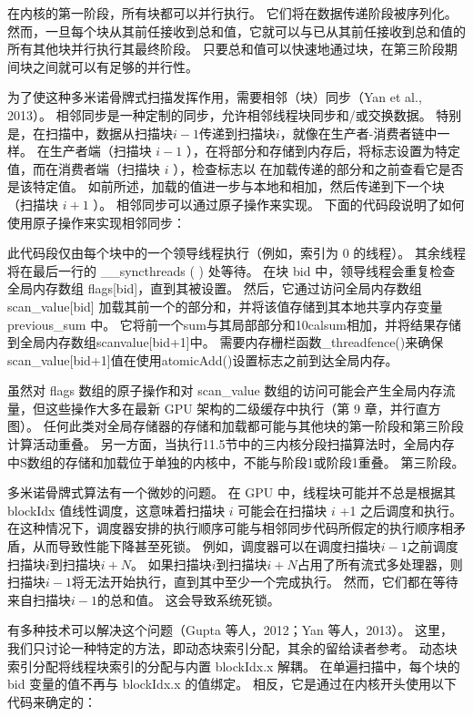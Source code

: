 在内核的第一阶段，所有块都可以并行执行。 它们将在数据传递阶段被序列化。 然而，一旦每个块从其前任接收到总和值，它就可以与已从其前任接收到总和值的所有其他块并行执行其最终阶段。 只要总和值可以快速地通过块，在第三阶段期间块之间就可以有足够的并行性。

为了使这种多米诺骨牌式扫描发挥作用，需要相邻（块）同步（Yan et al., 2013）。 相邻同步是一种定制的同步，允许相邻线程块同步和/或交换数据。 特别是，在扫描中，数据从扫描块$i-1$传递到扫描块$i$，就像在生产者-消费者链中一样。 在生产者端（扫描块 $i-1$ ），在将部分和存储到内存后，将标志设置为特定值，而在消费者端（扫描块 $i$ ），检查标志以 在加载传递的部分和之前查看它是否是该特定值。 如前所述，加载的值进一步与本地和相加，然后传递到下一个块（扫描块 $i+1$ ）。 相邻同步可以通过原子操作来实现。 下面的代码段说明了如何使用原子操作来实现相邻同步：

此代码段仅由每个块中的一个领导线程执行（例如，索引为 0 的线程）。 其余线程将在最后一行的 \_\_syncthreads ( ) 处等待。 在块 bid 中，领导线程会重复检查全局内存数组 flags[bid]，直到其被设置。 然后，它通过访问全局内存数组 scan\_value[bid] 加载其前一个的部分和，并将该值存储到其本地共享内存变量 previous\_sum 中。 它将前一个sum与其局部部分和10calsum相加，并将结果存储到全局内存数组scanvalue[bid+1]中。 需要内存栅栏函数\_threadfence()来确保scan\_value[bid+1]值在使用atomicAdd()设置标志之前到达全局内存。

虽然对 flags 数组的原子操作和对 scan\_value 数组的访问可能会产生全局内存流量，但这些操作大多在最新 GPU 架构的二级缓存中执行（第 9 章，并行直方图）。 任何此类对全局存储器的存储和加载都可能与其他块的第一阶段和第三阶段计算活动重叠。 另一方面，当执行11.5节中的三内核分段扫描算法时，全局内存中$\mathrm{S}$数组的存储和加载位于单独的内核中，不能与阶段1或阶段1重叠。 第三阶段。

多米诺骨牌式算法有一个微妙的问题。 在 GPU 中，线程块可能并不总是根据其 blockIdx 值线性调度，这意味着扫描块 $i$ 可能会在扫描块 $i$ +1 之后调度和执行。 在这种情况下，调度器安排的执行顺序可能与相邻同步代码所假定的执行顺序相矛盾，从而导致性能下降甚至死锁。 例如，调度器可以在调度扫描块$i-1$之前调度扫描块$i$到扫描块$i+N$。 如果扫描块$i$到扫描块$i+N$占用了所有流式多处理器，则扫描块$i-1$将无法开始执行，直到其中至少一个完成执行。 然而，它们都在等待来自扫描块$i-1$的总和值。 这会导致系统死锁。

有多种技术可以解决这个问题（Gupta 等人，2012；Yan 等人，2013）。 这里，我们只讨论一种特定的方法，即动态块索引分配，其余的留给读者参考。 动态块索引分配将线程块索引的分配与内置 blockIdx.x 解耦。 在单遍扫描中，每个块的 bid 变量的值不再与 blockIdx.x 的值绑定。 相反，它是通过在内核开头使用以下代码来确定的：

